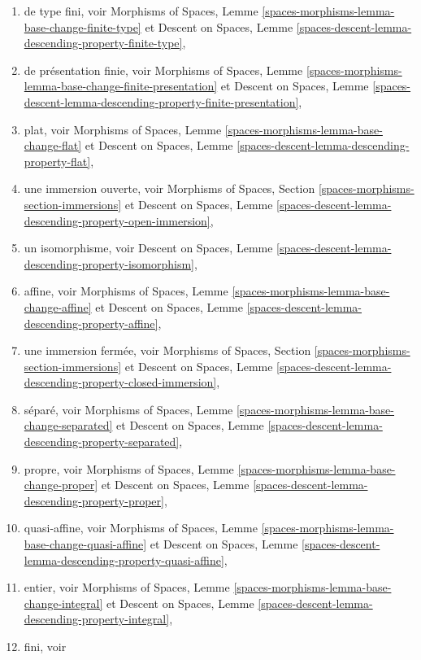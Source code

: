 \begin{enumerate}
et
Descent on Spaces, Lemme
\ref{spaces-descent-lemma-descending-property-locally-finite-presentation},
\item de type fini, voir
Morphisms of Spaces,
Lemme \ref{spaces-morphisms-lemma-base-change-finite-type}
et
Descent on Spaces,
Lemme \ref{spaces-descent-lemma-descending-property-finite-type},
\item de présentation finie, voir
Morphisms of Spaces,
Lemme \ref{spaces-morphisms-lemma-base-change-finite-presentation}
et
Descent on Spaces, Lemme
\ref{spaces-descent-lemma-descending-property-finite-presentation},
\item plat, voir
Morphisms of Spaces,
Lemme \ref{spaces-morphisms-lemma-base-change-flat}
et
Descent on Spaces,
Lemme \ref{spaces-descent-lemma-descending-property-flat},
\item une immersion ouverte, voir
Morphisms of Spaces,
Section \ref{spaces-morphisms-section-immersions}
et
Descent on Spaces,
Lemme \ref{spaces-descent-lemma-descending-property-open-immersion},
\item un isomorphisme, voir
Descent on Spaces,
Lemme \ref{spaces-descent-lemma-descending-property-isomorphism},
\item affine, voir
Morphisms of Spaces,
Lemme \ref{spaces-morphisms-lemma-base-change-affine}
et
Descent on Spaces,
Lemme \ref{spaces-descent-lemma-descending-property-affine},
\item une immersion fermée, voir
Morphisms of Spaces, Section \ref{spaces-morphisms-section-immersions}
et
Descent on Spaces,
Lemme \ref{spaces-descent-lemma-descending-property-closed-immersion},
\item séparé, voir
Morphisms of Spaces,
Lemme \ref{spaces-morphisms-lemma-base-change-separated}
et
Descent on Spaces,
Lemme \ref{spaces-descent-lemma-descending-property-separated},
\item propre, voir
Morphisms of Spaces,
Lemme \ref{spaces-morphisms-lemma-base-change-proper}
et
Descent on Spaces,
Lemme \ref{spaces-descent-lemma-descending-property-proper},
\item quasi-affine, voir
Morphisms of Spaces,
Lemme \ref{spaces-morphisms-lemma-base-change-quasi-affine}
et
Descent on Spaces,
Lemme \ref{spaces-descent-lemma-descending-property-quasi-affine},
\item entier, voir
Morphisms of Spaces,
Lemme \ref{spaces-morphisms-lemma-base-change-integral}
et
Descent on Spaces,
Lemme \ref{spaces-descent-lemma-descending-property-integral},
\item fini, voir

\end{enumerate}
